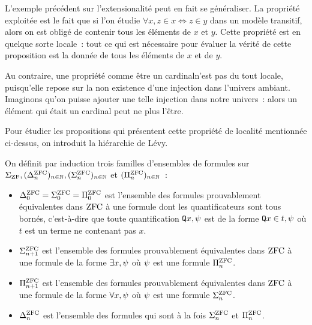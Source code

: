 L'exemple précédent sur l'extensionalité peut en fait se généraliser. La
propriété exploitée est le fait que si l'on étudie
$\forall x, z \in x \iff z \in y$ dans un modèle transitif, alors on est obligé
de contenir tous les éléments de $x$ et $y$. Cette propriété est en quelque
sorte locale~: tout ce qui est nécessaire pour évaluer la vérité de cette
proposition est la donnée de tous les éléments de $x$ et de $y$.

Au contraire, une propriété comme \og être un cardinal\fg n'est pas du tout
locale, puisqu'elle repose sur la non existence d'une injection dans l'univers
ambiant. Imaginons qu'on puisse ajouter une telle injection dans notre univers~:
alors un élément qui était un cardinal peut ne plus l'être.

Pour étudier les propositions qui présentent cette propriété de localité
mentionnée ci-dessus, on introduit la hiérarchie de Lévy.

\begin{definition}\label{def.Levy}
  On définit par induction trois familles d'ensembles de formules sur
  $\Sigma_{\operatorname{ZF}}, (\Delta_{n}^{\operatorname{ZFC}})_{n\in\mathbb N}, (\Sigma_{n}^{\operatorname{ZFC}})_{n\in\mathbb N}$
  et $(\Pi_{n}^{\operatorname{ZFC}})_{n \in \mathbb N}$~:
  \begin{itemize}
  \item $\Delta_{0}^{\operatorname{ZFC}}=\Sigma_{0}^{\operatorname{ZFC}}=\Pi_{0}^{\operatorname{ZFC}}$ est l'ensemble des formules
    prouvablement équivalentes dans $\operatorname{ZFC}$ à une formule dont les
    quantificateurs sont tous bornés, c'est-à-dire que toute quantification
    ${\normalfont\texttt{Q}} x, \psi$ est de la forme ${\normalfont\texttt{Q}} x \in t, \psi$ où $t$ est
    un terme ne contenant pas $x$.
  \item $\Sigma_{n+1}^{\operatorname{ZFC}}$ est l'ensemble des formules prouvablement équivalentes
    dans $\operatorname{ZFC}$ à une formule de la forme $\exists x, \psi$ où $\psi$ est
    une formule $\Pi_{n}^{\operatorname{ZFC}}$.
  \item $\Pi_{n+1}^{\operatorname{ZFC}}$ est l'ensemble des formules prouvablement équivalentes
    dans $\operatorname{ZFC}$ à une formule de la forme $\forall x, \psi$ où $\psi$ est
    une formule $\Sigma_{n}^{\operatorname{ZFC}}$.
  \item $\Delta_{n}^{\operatorname{ZFC}}$ est l'ensemble des formules qui sont à la fois
    $\Sigma_{n}^{\operatorname{ZFC}}$ et $\Pi_{n}^{\operatorname{ZFC}}$.
  \end{itemize}

\end{definition}

